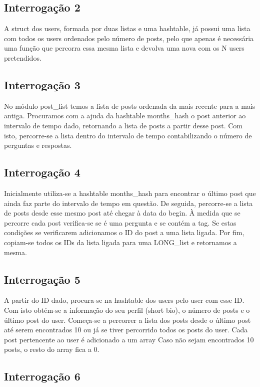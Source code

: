 \documentclass[10pt]{article}
\begin{document}
\subsection{Interrogação 2}

	A struct dos users, formada por duas listas e uma hashtable, já possui uma lista com todos os users ordenados pelo número de posts, pelo que apenas é necessária uma função que percorra essa mesma lista e devolva uma nova com os N users pretendidos.

\subsection{Interrogação 3}

	No módulo post\_list temos a lista de posts ordenada da mais recente para a mais antiga.
	Procuramos com a ajuda da hashtable months\_hash o post anterior ao intervalo de tempo dado, retornando a lista de posts a partir desse post. Com isto, percorre-se a lista dentro do intervalo de tempo contabilizando o número de perguntas e respostas.

\subsection{Interrogação 4}

	Inicialmente utiliza-se a hashtable months\_hash para encontrar o último post que ainda faz parte do intervalo de tempo em questão. De seguida, percorre-se a lista de posts desde esse mesmo post até chegar à data do begin. À medida que se percorre cada post verifica-se se é uma pergunta e se contém a tag. Se estas condições se verificarem adicionamos o ID do post a uma lista ligada. Por fim, copiam-se todos os IDs da lista ligada para uma LONG\_list e retornamos a mesma.

\subsection{Interrogação 5}

	A partir do ID dado, procura-se na hashtable dos users pelo user com esse ID. Com isto obtém-se a informação do seu perfil (short bio), o número de posts e o último post do user.
	Começa-se a percorrer a lista dos posts desde o último post até serem encontrados 10 ou já se tiver percorrido todos os posts do user.
	Cada post pertencente ao user é adicionado a um array
	Caso não sejam encontrados 10 posts, o resto do array fica a 0.

\subsection{Interrogação 6}
\end{document}
